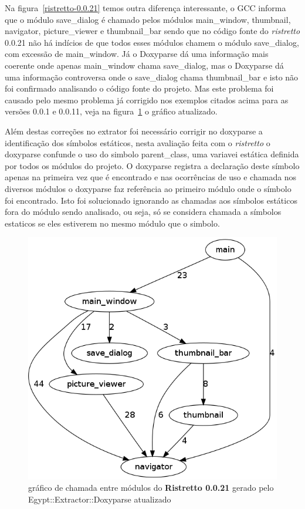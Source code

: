 Na figura~\ref{ristretto-0.0.21} temos outra diferença interessante, o GCC
informa que o módulo save\_dialog é chamado pelos módulos main\_window,
thumbnail, navigator, picture\_viewer e thumbnail\_bar sendo que no código
fonte do {\it ristretto} 0.0.21 não há indícios de que todos esses módulos chamem o
módulo save\_dialog, com excessão de main\_window. Já o Doxyparse dá uma
informação mais coerente onde apenas main\_window chama save\_dialog, mas o
Doxyparse dá uma informação controversa onde o save\_dialog chama
thumbnail\_bar e isto não foi confirmado analisando o código fonte do projeto.
Mas este problema foi causado pelo mesmo problema já corrigido nos exemplos
citados acima para as versões 0.0.1 e 0.0.11, veja na
figura~\ref{ristretto-0.0.21-doxyparse-2} o gráfico atualizado.

Além destas correções no extrator foi necessário corrigir no doxyparse a
identificação dos símbolos estáticos, nesta avaliação feita com o {\it ristretto} o
doxyparse confunde o uso do simbolo parent\_class, uma variavei estática
definida por todos os módulos do projeto. O doxyparse registra a declaração
deste símbolo apenas na primeira vez que é encontrado e nas ocorrências de uso
e chamada nos diversos módulos o doxyparse faz referência ao primeiro módulo
onde o símbolo foi encontrado. Isto foi solucionado ignorando as chamadas aos
símbolos estáticos fora do módulo sendo analisado, ou seja, só se considera
chamada a símbolos estaticos se eles estiverem no mesmo módulo que o simbolo.

\begin{figure}
\center
\includegraphics[scale=0.3]{imagens/ristretto-0_0_21-doxyparse-2}
\caption{gráfico de chamada entre módulos do {\bf Ristretto 0.0.21} gerado pelo Egypt::Extractor::Doxyparse atualizado}
\label{ristretto-0.0.21-doxyparse-2}
\end{figure}

